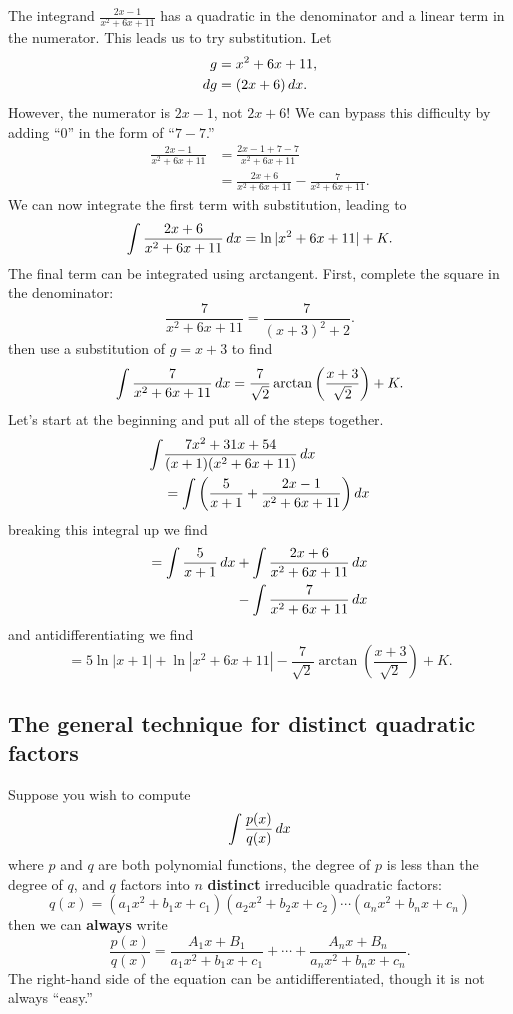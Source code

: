 \documentclass{ximera}
\begin{document}
\begin{example}
\begin{explanation}
    The integrand $\frac{2x-1}{x^2+6x+11}$ has a quadratic in the
    denominator and a linear term in the numerator. This leads us to
    try substitution. Let
    \begin{align*}
      g &= x^2+6x+11,\\
      \mathop{}\!d g  &= (2x+6)\mathop{}\!d x.
    \end{align*}
    However, the numerator is $2x-1$, not $2x+6$! We can bypass this
    difficulty by adding ``$0$'' in the form of ``$7-7$.''
\begin{align*}
  \frac{2x-1}{x^2+6x+11} &= \frac{2x-1+7-7}{x^2+6x+11} \\
  &= \frac{2x+6}{x^2+6x+11} - \frac{7}{x^2+6x+11}.
\end{align*}
We can now integrate the first term with substitution, leading to
\[
\int \frac{2x+6}{x^2+6x+11} \mathop{}\!d x = \ln|x^2+6x+11| + K.
\]
The final term can be integrated using arctangent. First, complete the
square in the denominator:
\[
\frac{7}{x^2+6x+11} = \frac{7}{(x+3)^2+2}.
\]
then use a substitution of $g = x+3$ to find
\[
\int \frac{7}{x^2+6x+11}\mathop{}\!d x = \frac{7}{\sqrt{2}}\arctan\left(\frac{x+3}{\sqrt{2}}\right)+K.
\]
Let's start at the beginning and put all of the steps together.
\begin{align*}
  \int&\frac{7x^2+31x+54}{(x+1)(x^2+6x+11)}\mathop{}\!d x \\
  &= \int\left(\frac{5}{x+1} + \frac{2x-1}{x^2+6x+11}\right)\mathop{}\!d x
\end{align*}
breaking this integral up we find
\begin{align*}
  = \int\frac{5}{x+1}\mathop{}\!d x  &+ \int\frac{2x+6}{x^2+6x+11}\mathop{}\!d x\\
  &-\int\frac{7}{x^2+6x+11}\mathop{}\!d x
\end{align*}
and antidifferentiating we find
\[
  = 5\ln|x+1|+ \ln|x^2+6x+11|-\frac{7}{\sqrt{2}}\arctan\left(\frac{x+3}{\sqrt{2}}\right)+K.
\]
  \end{explanation}
\end{example}


\subsection{The general technique for distinct quadratic factors}

Suppose you wish to compute
\[
\int \frac{p(x)}{q(x)} \mathop{}\!d x
\]
where $p$ and $q$ are both polynomial functions, the degree of $p$ is
less than the degree of $q$, and $q$ factors into $n$
\textbf{distinct} irreducible quadratic factors:
\[
q(x) = (a_1x^2 + b_1 x + c_1) (a_2x^2 + b_2 x + c_2)\cdots  (a_nx^2 + b_n x + c_n) 
\]
then we can \textbf{always} write
\[
\frac{p(x)}{q(x)}  = \frac{A_1x+B_1}{a_1x^2 + b_1 x + c_1} + \cdots + \frac{A_nx+B_n}{a_nx^2 + b_n x + c_n}. 
\]
The right-hand side of the equation can be antidifferentiated, though it is not always ``easy.''
\end{document}
